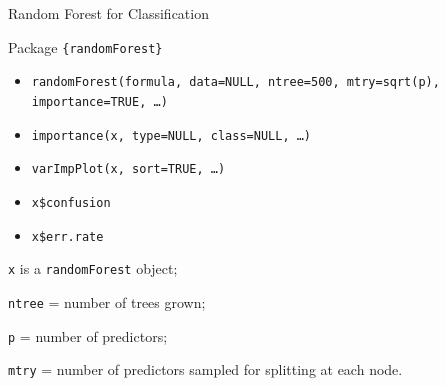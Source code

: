 

\begin{frame}{Random Forest for Classification}

{\footnotesize Package \texttt{\{randomForest\}}\vspace{-1ex}
\begin{itemize}\setlength{\itemsep}{-0.5ex}
	\item \texttt{randomForest(formula, data={\color{blue}NULL}, ntree={\color{red}500}, mtry={\color{blue}sqrt}(p), importance={\color{red}TRUE}, \dots)}
	\item \texttt{importance(x, type={\color{blue}NULL}, class={\color{blue}NULL}, \dots)}
    \item \texttt{varImpPlot(x, sort={\color{red}TRUE}, \dots)}
    \item \texttt{x\$confusion}
    \item \texttt{x\$err.rate}
\end{itemize}}

{\texttt{x}} is a {\texttt{randomForest}} object;

{\texttt{ntree}} = number of trees grown;

{\texttt{p}} = number of predictors;

{\texttt{mtry}} = number of predictors sampled for splitting at each node.

\end{frame}


